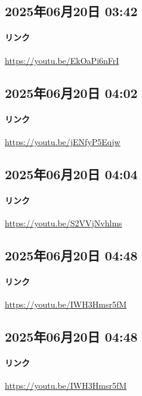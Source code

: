 \subsection*{2025年06月20日 03:42}

\paragraph{リンク}
\url{https://youtu.be/EkOaPi6nFrI}

\subsection*{2025年06月20日 04:02}

\paragraph{リンク}
\url{https://youtu.be/jENfyP5Eqjw}

\subsection*{2025年06月20日 04:04}

\paragraph{リンク}
\url{https://youtu.be/S2VVjNvhlms}

\subsection*{2025年06月20日 04:48}

\paragraph{リンク}
\url{https://youtu.be/IWH3Hmsr5fM}

\subsection*{2025年06月20日 04:48}

\paragraph{リンク}
\url{https://youtu.be/IWH3Hmsr5fM}

